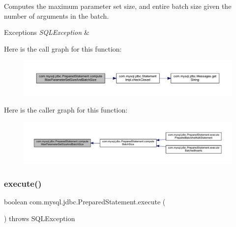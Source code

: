 Computes the maximum parameter set size, and entire batch size given the number of arguments in the batch.


\begin{DoxyExceptions}{Exceptions}
{\em S\+Q\+L\+Exception} & \\
\hline
\end{DoxyExceptions}
Here is the call graph for this function\+:
\nopagebreak
\begin{figure}[H]
\begin{center}
\leavevmode
\includegraphics[width=350pt]{classcom_1_1mysql_1_1jdbc_1_1_prepared_statement_a0bd3fe8e5e85dd522b3d84fb68b142ff_cgraph}
\end{center}
\end{figure}
Here is the caller graph for this function\+:
\nopagebreak
\begin{figure}[H]
\begin{center}
\leavevmode
\includegraphics[width=350pt]{classcom_1_1mysql_1_1jdbc_1_1_prepared_statement_a0bd3fe8e5e85dd522b3d84fb68b142ff_icgraph}
\end{center}
\end{figure}
\mbox{\label{classcom_1_1mysql_1_1jdbc_1_1_prepared_statement_a4c83f4279e13f60aa65dd4de3d2117e1}} 
\subsubsection{\texorpdfstring{execute()}{execute()}}
{\footnotesize\ttfamily boolean com.\+mysql.\+jdbc.\+Prepared\+Statement.\+execute (\begin{DoxyParamCaption}{ }\end{DoxyParamCaption}) throws S\+Q\+L\+Exception}

